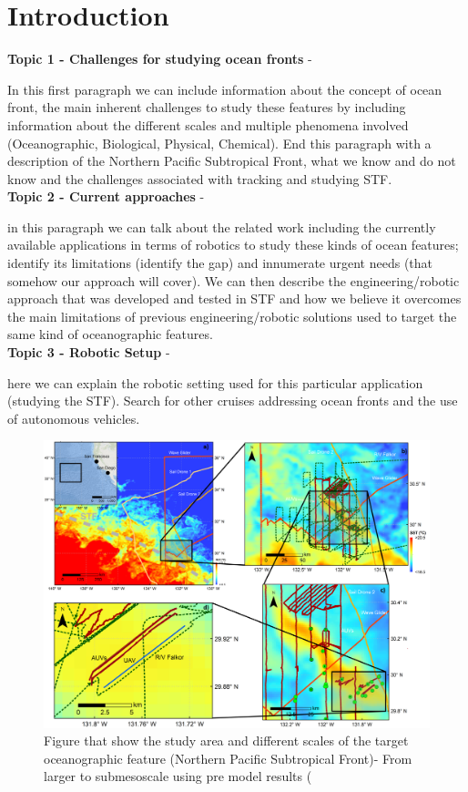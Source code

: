\section*{Introduction}
\textbf{Topic 1 - Challenges for studying ocean fronts} - 

In this first paragraph we can include information about the concept of ocean front, the main inherent challenges to study these features by including information about the different scales and multiple phenomena involved (Oceanographic, Biological, Physical, Chemical). End this paragraph with a description of the Northern Pacific Subtropical Front, what we know and do not know and the challenges associated with tracking and studying STF.\\

\textbf{Topic 2 - Current approaches } - 

in this paragraph we can talk about the related work including the currently available applications in terms of robotics to study these kinds of ocean features; identify its limitations (identify the gap) and innumerate urgent needs (that somehow our approach will cover). We can then describe the engineering/robotic approach that was developed and tested in STF and how we believe it overcomes the main limitations of previous engineering/robotic solutions used to target the same kind of oceanographic features. \\ 

\textbf{Topic 3 - Robotic Setup} - 

here we can explain the robotic setting used for this particular application (studying the STF). Search for other cruises addressing ocean fronts and the use of autonomous vehicles. 

\begin{figure}
    \centering
    \includegraphics[width=.5\linewidth]{figs/fig_multiscale.png}
    \caption{Figure that show the study area and different scales of the target oceanographic feature (Northern Pacific Subtropical Front)- From larger to submesoscale using pre model results (}
    \label{fig:block}
\end{figure}

\begin{figure}
    \centering
    \label{fig:block}
\end{figure}

